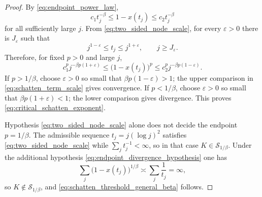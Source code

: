 \documentclass[11pt]{amsart}
\numberwithin{equation}{section}
\theoremstyle{plain}
\theoremstyle{definition}
\theoremstyle{remark}
\begin{document}
\begin{proof}
By \eqref{eq:endpoint_power_law},
\begin{equation}
c_1 t_j^{-\beta}\le 1-x(t_j)\le c_2 t_j^{-\beta}
\end{equation}
for all sufficiently large $j$. From \eqref{eq:two_sided_node_scale}, for every $\varepsilon>0$ there is $J_\varepsilon$ such that
\begin{equation}
j^{1-\varepsilon}\le t_j\le j^{1+\varepsilon},
\qquad j\ge J_\varepsilon.
\label{eq:two_sided_power_bounds}
\end{equation}
Therefore, for fixed $p>0$ and large $j$,
\begin{equation}
c_1^p j^{-\beta p(1+\varepsilon)}
\le
\bigl(1-x(t_j)\bigr)^p
\le
c_2^p j^{-\beta p(1-\varepsilon)}.
\label{eq:schatten_term_scale}
\end{equation}
If $p>1/\beta$, choose $\varepsilon>0$ so small that $\beta p(1-\varepsilon)>1$; the upper comparison in \eqref{eq:schatten_term_scale} gives convergence. If $p<1/\beta$, choose $\varepsilon>0$ so small that $\beta p(1+\varepsilon)<1$; the lower comparison gives divergence. This proves \eqref{eq:critical_schatten_exponent}.

Hypothesis \eqref{eq:two_sided_node_scale} alone does not decide the endpoint $p=1/\beta$. The admissible sequence $t_j=j(\log j)^2$ satisfies \eqref{eq:two_sided_node_scale} while $\sum_j t_j^{-1}<\infty$, so in that case $K\in\mathcal S_{1/\beta}$. Under the additional hypothesis \eqref{eq:endpoint_divergence_hypothesis} one has
\begin{equation}
\sum_j\bigl(1-x(t_j)\bigr)^{1/\beta}\asymp\sum_j\frac1{t_j}=\infty,
\end{equation}
so $K\notin\mathcal S_{1/\beta}$, and \eqref{eq:schatten_threshold_general_beta} follows.
\end{proof}
\end{document}
